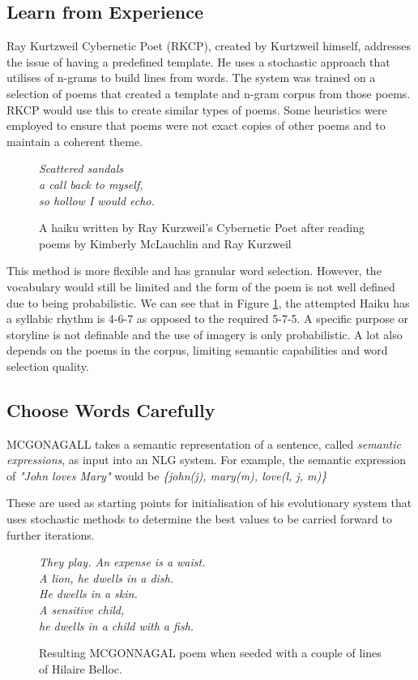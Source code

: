 \subsection{Learn from Experience}
\label{sec:RKCP}

Ray Kurtzweil Cybernetic Poet (RKCP), created by Kurtzweil himself\cite{kurzweil1999ray}, addresses the issue of having a predefined template. He uses a stochastic approach that utilises of n-grams to build lines from words. The system was trained on a selection of poems that created a template and n-gram corpus from those poems. RKCP would use this to create similar types of poems. Some heuristics were employed to ensure that poems were not exact copies of other poems and to maintain a coherent theme.

\begin{figure}[h!]
\centering
\textit{
Scattered sandals\\
a call back to myself,\\
so hollow I would echo.
}
\caption{A haiku written by Ray Kurzweil's Cybernetic Poet after reading poems by Kimberly McLauchlin and Ray Kurzweil}
\label{fig:rkcp}
\end{figure}

This method is more flexible and has granular word selection. However, the vocabulary would still be limited and the form of the poem is not well defined due to being probabilistic. We can see that in Figure \ref{fig:rkcp}, the attempted Haiku has a syllabic rhythm is 4-6-7 as opposed to the required 5-7-5. A specific purpose or storyline is not definable and the use of imagery is only probabilistic. A lot also depends on the poems in the corpus, limiting semantic capabilities and word selection quality.


\subsection{Choose Words Carefully}
\label{sec:mcg}
MCGONAGALL\cite{manurung2004evolutionary} takes a semantic representation of a sentence, called \textit{semantic expressions}, as input into an NLG system. For example, the semantic expression of \textit{"John loves Mary"} would be \textit{\{john(j), mary(m), love(l, j, m)\}}

These are used as starting points for initialisation of his evolutionary system that uses stochastic methods to determine the best values to be carried forward to further iterations.

\begin{figure}[h!]
\centering
\textit{
They play. An expense is a waist.\\
A lion, he dwells in a dish.\\
He dwells in a skin.\\
A sensitive child,\\
he dwells in a child with a fish.\\
}
\caption{Resulting MCGONNAGAL poem when seeded with a couple of lines of Hilaire Belloc.}
\label{fig:mcg}
\end{figure}

